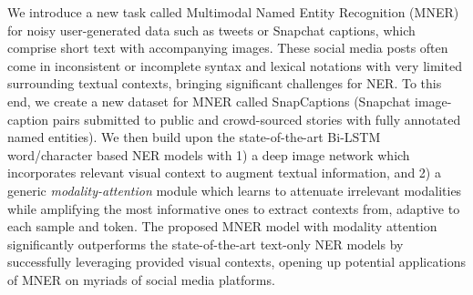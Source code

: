We introduce a new task called Multimodal Named Entity Recognition (MNER) for noisy user-generated data such as tweets or Snapchat captions, which comprise short text with accompanying images. These social media posts often come in inconsistent or incomplete syntax and lexical notations with very limited surrounding textual contexts, bringing significant challenges for NER. To this end, we create a new dataset for MNER called SnapCaptions (Snapchat image-caption pairs submitted to public and crowd-sourced stories with fully annotated named entities). We then build upon the state-of-the-art Bi-LSTM word/character based NER models with 1) a deep image network which incorporates relevant visual context to augment textual information, and 2) a generic \textit{modality-attention} module which learns to attenuate irrelevant modalities while amplifying the most informative ones to extract contexts from, adaptive to each sample and token. The proposed MNER model with modality attention significantly outperforms the state-of-the-art text-only NER models by successfully leveraging provided visual contexts, opening up potential applications of MNER on myriads of social media platforms.
